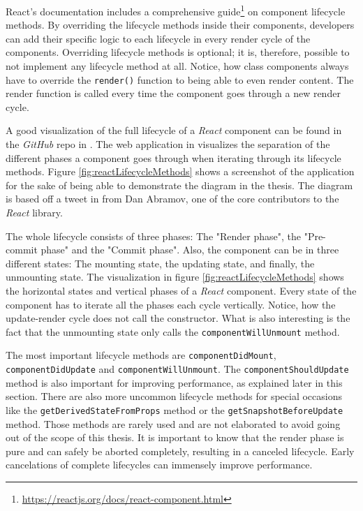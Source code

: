 React's documentation includes a comprehensive guide\footnote{\url{https://reactjs.org/docs/react-component.html}} on component lifecycle methods. By overriding the lifecycle methods inside their components, developers can add their specific logic to each lifecycle in every render cycle of the components. Overriding lifecycle methods is optional; it is, therefore, possible to not implement any lifecycle method at all. Notice, how class components always have to override the \texttt{render()} function to being able to even render content. The render function is called every time the component goes through a new render cycle.

A good visualization of the full lifecycle of a \emph{React} component can be found in the \emph{GitHub} repo in \cite{ReactRenderCycleGithub}. The web application in \cite{ReactRenderCycleDiagram} visualizes the separation of the different phases a component goes through when iterating through its lifecycle methods. Figure \ref{fig:reactLifecycleMethods} shows a screenshot of the application for the sake of being able to demonstrate the diagram in the thesis. The diagram is based off a tweet in \cite{ReactCycleTweet} from Dan Abramov, one of the core contributors to the \emph{React} library.

The whole lifecycle consists of three phases: The "Render phase", the "Pre-commit phase" and the "Commit phase". Also, the component can be in three different states: The mounting state, the updating state, and finally, the unmounting state. The visualization in figure \ref{fig:reactLifecycleMethods} shows the horizontal states and vertical phases of a \emph{React} component. Every state of the component has to iterate all the phases each cycle vertically. Notice, how the update-render cycle does not call the constructor. What is also interesting is the fact that the unmounting state only calls the \texttt{componentWillUnmount} method.

The most important lifecycle methods are \texttt{component\-Did\-Mount}, \texttt{component\-Did\-Update} and \texttt{component\-Will\-Unmount}. The \texttt{componentShouldUpdate} method is also important for improving performance, as explained later in this section. There are also more uncommon lifecycle methods for special occasions like the \texttt{getDerivedStateFromProps} method or the \texttt{getSnapshotBeforeUpdate} method. Those methods are rarely used and are not elaborated to avoid going out of the scope of this thesis. It is important to know that the render phase is pure and can safely be aborted completely, resulting in a canceled lifecycle. Early cancelations of complete lifecycles can immensely improve performance.


